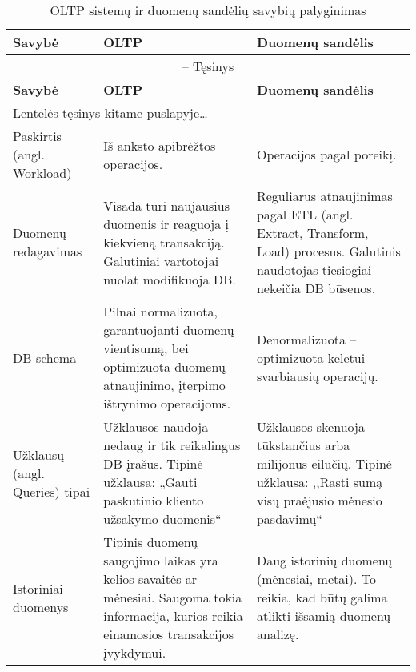 \documentclass[12pt,a4paper,titlepage]{article}
\begin{document}
\begin{longtable}{|p{3cm}|p{4.9cm}|p{4.9cm}|}
\caption{OLTP sistemų ir duomenų sandėlių savybių palyginimas \label{table:oltpsvsdw}}\\

\hline \hline
{\textbf{Savybė}} &
{\textbf{OLTP}} &
{\textbf{Duomenų sandėlis}}\\
\hline
\endfirsthead


\multicolumn{3}{c}{{\tablename} \thetable{} -- Tęsinys} \\[0.5ex]
\hline \hline
{\textbf{Savybė}} &
{\textbf{OLTP}} &
{\textbf{Duomenų sandėlis}}\\
\hline
\endhead


\multicolumn{3}{l}{{Lentelės tęsinys kitame puslapyje\ldots}} \\
\endfoot


\hline \hline
\endlastfoot
\hline 
Paskirtis (angl. Workload)
&
Iš anksto apibrėžtos operacijos.
&
Operacijos pagal poreikį.
\\
\hline
Duomenų redagavimas
&
Visada turi naujausius duomenis ir reaguoja į kiekvieną transakciją. Galutiniai vartotojai nuolat modifikuoja DB.
&
Reguliarus atnaujinimas pagal ETL (angl. Extract, Transform, Load) procesus. Galutinis naudotojas tiesiogiai nekeičia DB būsenos.
\\
\hline
DB schema
&
Pilnai normalizuota, garantuojanti duomenų vientisumą, bei optimizuota duomenų atnaujinimo, įterpimo ištrynimo operacijoms.
&
Denormalizuota – optimizuota keletui svarbiausių operacijų.
\\
\hline
Užklausų (angl. Queries) tipai
&
Užklausos naudoja nedaug ir tik reikalingus DB įrašus. Tipinė užklausa: „Gauti paskutinio kliento užsakymo duomenis“
&
Užklausos skenuoja tūkstančius arba milijonus eilučių. Tipinė užklausa: ,,Rasti sumą visų praėjusio mėnesio pasdavimų``
\\
\hline
Istoriniai duomenys
&
Tipinis duomenų saugojimo laikas yra kelios savaitės ar mėnesiai. Saugoma tokia informacija, kurios reikia einamosios transakcijos įvykdymui.
&
Daug istorinių duomenų (mėnesiai, metai). To reikia, kad būtų galima atlikti išsamią duomenų analizę.
\end{longtable}
\end{document}

